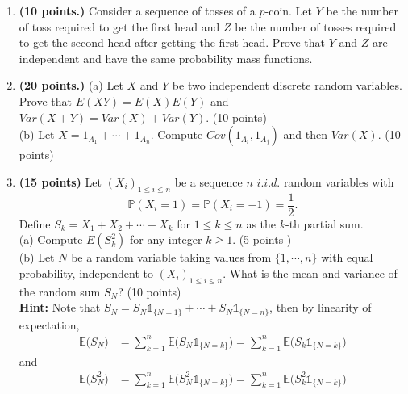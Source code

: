 \documentclass[12pt]{article}
\begin{document}
\begin{enumerate}
    \item \textbf{(10 points.)}
    Consider a sequence of tosses of a $p$-coin.
    Let $Y$ be the number of toss required to get the first head and $Z$ be the number of tosses required to get the second head after getting the first head.
    Prove that $Y$ and $Z$ are independent and have the same probability mass functions.

    \item \textbf{(20 points.)}
    (a) Let $X$ and $Y$ be two independent discrete random variables. Prove that $E(XY)=E(X)E(Y)$ and $Var(X+Y)=Var(X)+Var(Y)$. (10 points)\\
    (b) Let $X=1_{A_{1}}+\cdots + 1_{A_{n}}$. Compute $Cov(1_{A_{i}},1_{A_{j}})$ and then $Var(X)$. (10 points)

    \item \textbf{(15 points)}
    Let $(X_i)_{1\leq i\leq n}$ be a sequence $n$ $i.i.d.$ random variables with
\begin{equation*}
\mathbb{P}(X_i=1)=\mathbb{P}(X_i=-1)=\frac{1}{2}.
\end{equation*}
Define $S_k=X_1+X_2+\cdots+X_k$ for $1\leq k\leq n$ as the $k$-th partial sum.\\
(a) Compute $E(S_{k}^{2})$ for any integer $k\ge 1$. (5 points )\\
(b) Let $N$ be a random variable taking values from $\{1,\cdots,n\}$ with equal probability, independent to $(X_i)_{1\leq i\leq n}$. What is the mean  and variance of the random sum $S_{N}$?  (10 points) \\
\textbf{Hint:} Note that $S_N=S_N\mathds{1}_{\{N=1\}}+\cdots+S_N\mathds{1}_{\{N=n\}}$, then by linearity of expectation,
\begin{equation*}
\begin{aligned}
\mathbb{E}\big(S_N\big) &= \sum_{k=1}^n\mathbb{E}\big(S_N \mathds{1}_{\{N=k\}}\big)=\sum_{k=1}^n\mathbb{E}\big(S_k \mathds{1}_{\{N=k\}}\big)
\end{aligned}
\end{equation*}
and
\begin{equation*}
\begin{aligned}
\mathbb{E}\big(S_N^2\big) &= \sum_{k=1}^n\mathbb{E}\big(S_N^2\mathds{1}_{\{N=k\}}\big)=\sum_{k=1}^n\mathbb{E}\big(S_k^2\mathds{1}_{\{N=k\}}\big)
\end{aligned}
\end{equation*}

\end{enumerate}
\end{document}

